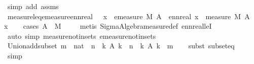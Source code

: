 \begin{isabellebody}
\ {\isacharparenleft}{\kern0pt}simp\ add{\isacharcolon}{\kern0pt}\ assms{\isacharparenright}{\kern0pt}%
\endisatagproof
{\isafoldproof}%
%
\isadelimproof
\isanewline
%
\endisadelimproof
\isanewline
{}\isamarkupfalse%
\ measure{\isacharunderscore}{\kern0pt}leq{\isacharunderscore}{\kern0pt}emeasure{\isacharunderscore}{\kern0pt}ennreal{\isacharcolon}{\kern0pt}\ {\isachardoublequoteopen}{}\ {\isasymle}\ x\ {\isasymLongrightarrow}\ emeasure\ M\ A\ {\isasymle}\ ennreal\ x\ {\isasymLongrightarrow}\ measure\ M\ A\ {\isasymle}\ x{\isachardoublequoteclose}\isanewline
%
\isadelimproof
\ \ %
\endisadelimproof
%
\isatagproof
{}\isamarkupfalse%
\ {\isacharparenleft}{\kern0pt}cases\ {\isachardoublequoteopen}A\ {\isasymin}\ M{\isachardoublequoteclose}{\isacharparenright}{\kern0pt}\isanewline
\ \ \ \isamarkupfalse%
\ {\isacharparenleft}{\kern0pt}metis\ Sigma{\isacharunderscore}{\kern0pt}Algebra{\isachardot}{\kern0pt}measure{\isacharunderscore}{\kern0pt}def\ enn{}real{\isacharunderscore}{\kern0pt}leI{\isacharparenright}{\kern0pt}\isanewline
\ \ \ \isamarkupfalse%
\ {\isacharparenleft}{\kern0pt}auto\ simp{\isacharcolon}{\kern0pt}\ measure{\isacharunderscore}{\kern0pt}notin{\isacharunderscore}{\kern0pt}sets\ emeasure{\isacharunderscore}{\kern0pt}notin{\isacharunderscore}{\kern0pt}sets{\isacharparenright}{\kern0pt}\isanewline
\ \ \isamarkupfalse%
%
\endisatagproof
{\isafoldproof}%
%
\isadelimproof
\isanewline
%
\endisadelimproof
\isanewline
{}\isamarkupfalse%
\ Union{\isacharunderscore}{\kern0pt}add{\isacharunderscore}{\kern0pt}subset{\isacharcolon}{\kern0pt}\ {\isachardoublequoteopen}{\isacharparenleft}{\kern0pt}m\ {\isacharcolon}{\kern0pt}{\isacharcolon}{\kern0pt}\ nat{\isacharparenright}{\kern0pt}\ {\isasymle}\ n\ {\isasymLongrightarrow}\ {\isacharparenleft}{\kern0pt}{\isasymUnion}k{\isachardot}{\kern0pt}\ A\ {\isacharparenleft}{\kern0pt}k\ {\isacharplus}{\kern0pt}\ n{\isacharparenright}{\kern0pt}{\isacharparenright}{\kern0pt}\ {\isasymsubseteq}\ {\isacharparenleft}{\kern0pt}{\isasymUnion}k{\isachardot}{\kern0pt}\ A\ {\isacharparenleft}{\kern0pt}k\ {\isacharplus}{\kern0pt}\ m{\isacharparenright}{\kern0pt}{\isacharparenright}{\kern0pt}{\isachardoublequoteclose}\isanewline
%
\isadelimproof
\ \ %
\endisadelimproof
%
\isatagproof
{}\isamarkupfalse%
\ {\isacharparenleft}{\kern0pt}subst\ subset{\isacharunderscore}{\kern0pt}eq{\isacharparenright}{\kern0pt}\isanewline
\ \ \isamarkupfalse%
\ simp\isanewline
\ \ \isamarkupfalse%

\end{isabellebody}
